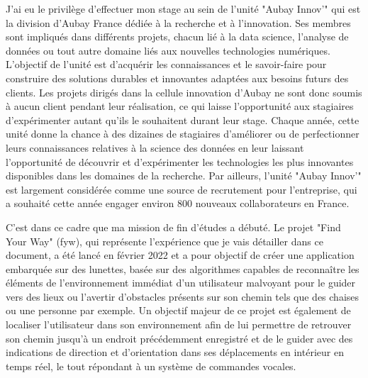 \documentclass[11pt]{article}
\begin{document}
  J'ai eu le privilège d'effectuer mon stage au sein de l'unité "Aubay Innov'" qui est la division d’Aubay France dédiée 
  à la recherche et à l'innovation. Ses membres sont impliqués dans différents projets, chacun lié à la data science, l'analyse 
  de données ou tout autre domaine liés aux nouvelles technologies numériques. L'objectif de l'unité est d'acquérir 
  les connaissances et le savoir-faire pour construire des solutions durables et innovantes adaptées aux besoins futurs des clients. 
  Les projets dirigés dans la cellule innovation d'Aubay ne sont donc soumis à aucun client pendant leur réalisation, 
  ce qui laisse l'opportunité aux stagiaires d'expérimenter autant qu'ils le souhaitent durant leur stage.
  Chaque année, cette unité donne la chance à des dizaines de stagiaires d'améliorer ou de perfectionner leurs connaissances
  relatives à la science des données en leur laissant l'opportunité de découvrir et d'expérimenter les technologies les plus 
  innovantes disponibles dans les domaines de la recherche. Par ailleurs, l'unité "Aubay Innov'" est largement considérée comme 
  une source de recrutement pour l'entreprise, qui a souhaité cette année engager environ 800 nouveaux collaborateurs en France. 
  
  C'est dans ce cadre que ma mission de fin d'études a débuté. Le projet "Find Your Way" (\acrshort{fyw}), qui représente l'expérience que je 
  vais détailler dans ce document, a été lancé en février 2022 et a pour objectif de créer une application embarquée sur des lunettes, 
  basée sur des algorithmes capables de reconnaître les éléments de l'environnement immédiat d'un utilisateur malvoyant pour le guider 
  vers des lieux ou l'avertir d'obstacles présents sur son chemin tels que des chaises ou une personne par exemple. Un objectif majeur 
  de ce projet est également de localiser l'utilisateur dans son environnement afin de lui permettre de retrouver son chemin jusqu'à
  un endroit précédemment enregistré et de le guider avec des indications de direction et d'orientation dans ses déplacements en intérieur
  en temps réel, le tout répondant à un système de commandes vocales.  
  
\end{document}
